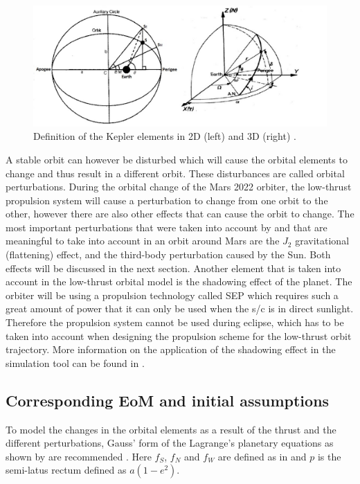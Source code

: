 \begin{figure}[!ht]
\centering
\includegraphics[width=1.0\textwidth]{figures/reference_frames/kepler_noomen2013basic_akcasu2013.jpg}
\caption{Definition of the Kepler elements in 2D (left) and 3D (right) \cite{noomen2013basic,akcasu2013}.}
\label{fig:kepler_noomen2013basic_akcasu2013}
\end{figure}

A stable orbit can however be disturbed which will cause the orbital elements to change and thus result in a different orbit. These disturbances are called orbital perturbations. During the orbital change of the Mars 2022 orbiter, the low-thrust propulsion system will cause a perturbation to change from one orbit to the other, however there are also other effects that can cause the orbit to change. The most important perturbations that were taken into account by \cite{gebbett2014multi} and that are meaningful to take into account in an orbit around Mars are the $J_{2}$ gravitational (flattening) effect, and the third-body perturbation caused by the Sun. Both effects will be discussed in the next section. Another element that is taken into account in the low-thrust orbital model is the shadowing effect of the planet. The orbiter will be using a propulsion technology called \ac{SEP} which requires such a great amount of power that it can only be used when the \ac{s/c} is in direct sunlight. Therefore the propulsion system cannot be used during eclipse, which has to be taken into account when designing the propulsion scheme for the low-thrust orbit trajectory. More information on the application of the shadowing effect in the simulation tool can be found in \cite{gebbett2014multi}.
 

\subsection{Corresponding \ac{EoM} and initial assumptions}
\label{subsec:eom_orb}
To model the changes in the orbital elements as a result of the thrust and the different perturbations, Gauss' form of the Lagrange's planetary equations as shown by  are recommended \cite{wakker2010,gebbett2014multi,petropoulos2005refinements}. Here $f_{S}$, $f_{N}$ and $f_{W}$ are defined as in  and $p$ is the semi-latus rectum defined as $a\left(1-e^{2}\right)$.

